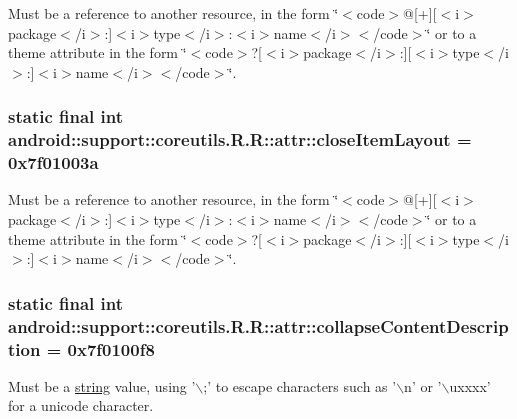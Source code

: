 Must be a reference to another resource, in the form \char`\"{}$<$code$>$@\mbox{[}+\mbox{]}\mbox{[}$<$i$>$package$<$/i$>$:\mbox{]}$<$i$>$type$<$/i$>$:$<$i$>$name$<$/i$>$$<$/code$>$\char`\"{} or to a theme attribute in the form \char`\"{}$<$code$>$?\mbox{[}$<$i$>$package$<$/i$>$:\mbox{]}\mbox{[}$<$i$>$type$<$/i$>$:\mbox{]}$<$i$>$name$<$/i$>$$<$/code$>$\char`\"{}. \hypertarget{classandroid_1_1support_1_1coreutils_1_1_r_1_1attr_4a20cb3e847b0301947a122149b75bfa}{
\subsubsection[{closeItemLayout}]{\setlength{\rightskip}{0pt plus 5cm}static final int android::support::coreutils.R.R::attr::closeItemLayout = 0x7f01003a}}
\label{classandroid_1_1support_1_1coreutils_1_1_r_1_1attr_4a20cb3e847b0301947a122149b75bfa}


Must be a reference to another resource, in the form \char`\"{}$<$code$>$@\mbox{[}+\mbox{]}\mbox{[}$<$i$>$package$<$/i$>$:\mbox{]}$<$i$>$type$<$/i$>$:$<$i$>$name$<$/i$>$$<$/code$>$\char`\"{} or to a theme attribute in the form \char`\"{}$<$code$>$?\mbox{[}$<$i$>$package$<$/i$>$:\mbox{]}\mbox{[}$<$i$>$type$<$/i$>$:\mbox{]}$<$i$>$name$<$/i$>$$<$/code$>$\char`\"{}. \hypertarget{classandroid_1_1support_1_1coreutils_1_1_r_1_1attr_ee7d0b450b157efddb4627551f53c9ad}{
\subsubsection[{collapseContentDescription}]{\setlength{\rightskip}{0pt plus 5cm}static final int android::support::coreutils.R.R::attr::collapseContentDescription = 0x7f0100f8}}
\label{classandroid_1_1support_1_1coreutils_1_1_r_1_1attr_ee7d0b450b157efddb4627551f53c9ad}


Must be a \hyperlink{classandroid_1_1support_1_1coreutils_1_1_r_1_1string}{string} value, using '$\backslash$;' to escape characters such as '$\backslash$n' or '$\backslash$uxxxx' for a unicode character. 

